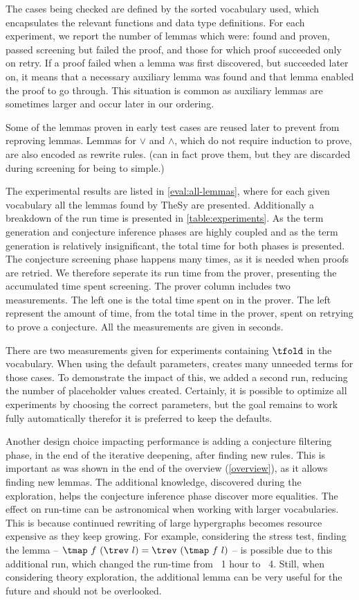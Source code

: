 The cases being checked are defined by the sorted vocabulary used, which encapsulates the relevant functions and data type definitions.
For each experiment, we report the number of lemmas which were: found and proven, passed screening but failed the proof, and those for which proof succeeded only on retry.
If a proof failed when a lemma was first discovered, but succeeded later on, it means that a necessary auxiliary lemma was found and that lemma enabled the proof to go through.
This situation is common as auxiliary lemmas are sometimes larger and occur later in our ordering.

Some of the lemmas proven in early test cases are reused later to prevent \TheSy from reproving lemmas. 
Lemmas for $\lor$ and $\land$, which do not require induction to prove, are also encoded as rewrite rules.
(\TheSy can in fact prove them, but they are discarded during screening for being to simple.)

The experimental results are listed in \autoref{eval:all-lemmas}, where for each given vocabulary all the lemmas found by TheSy are presented. Additionally a breakdown of the run time is presented in \autoref{table:experiments}. As the term generation and conjecture inference phases are highly coupled and as the term generation is relatively insignificant, the total time for both phases is presented.
The conjecture screening phase happens many times, as it is needed when proofs are retried.
We therefore seperate its run time from the prover, presenting the accumulated time spent screening.
The prover column includes two measurements. 
The left one is the total time spent on in the prover.
The left represent the amount of time, from the total time in the prover, spent on retrying to prove a conjecture.
All the measurements are given in seconds.

There are two measurements given for experiments containing $\tfold$ in the vocabulary.
When using the default parameters, \TheSy creates many unneeded terms for those cases.
To demonstrate the impact of this, we added a second run, reducing the number of placeholder values created.
Certainly, it is possible to optimize all experiments by choosing the correct parameters, but the goal remains to work fully automatically therefor it is preferred to keep the defaults.

Another design choice impacting performance is adding a conjecture filtering phase, in the end of the iterative deepening, after finding new rules.
This is important as was shown in the end of the overview (\autoref{overview}), as it allows finding new lemmas.
The additional knowledge, discovered during the exploration, helps the conjecture inference phase discover more equalities.
The effect on run-time can be astronomical when working with larger vocabularies.
This is because continued rewriting of large hypergraphs becomes resource expensive as they keep growing.
For example, considering the stress test, finding the lemma -- $\tmap~f~(\trev~l) = \trev~(\tmap~f~l)$ -- is possible due to this additional run, which changed the run-time from ~1 hour to ~4.
Still, when considering theory exploration, the additional lemma can be very useful for the future and should not be overlooked.

